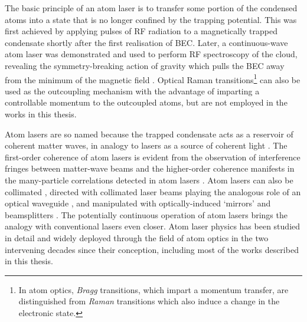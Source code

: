 	The basic principle of an atom laser is to transfer some portion of the condensed atoms into a state that is no longer confined by the trapping potential. This was first achieved by applying pulses of RF radiation to a magnetically trapped condensate shortly after the first realisation of BEC\cite{mewes97}. Later, a continuous-wave atom laser was demonstrated and used to perform RF spectroscopy of the cloud, revealing the symmetry-breaking action of gravity which pulls the BEC away from the minimum of the magnetic field \cite{bloch99}. Optical Raman transitions\footnote{In atom optics, \emph{Bragg} transitions, which impart a momentum transfer, are distinguished from  \emph{Raman} transitions which also induce a change in the electronic state.} can also be used as the outcoupling mechanism \cite{Hagley99} with the advantage of imparting a controllable momentum to the outcoupled atoms, but are not employed in the works in this thesis. 

	Atom lasers are so named because the trapped condensate acts as a reservoir of coherent matter waves, in analogy to lasers as a source of coherent light \cite{narashewski,glauberXX}. The first-order coherence of atom lasers is evident from the observation of interference fringes between matter-wave beams \cite{andrews97} and the higher-order coherence manifests in the many-particle correlations detected in \mhe atom lasers \cite{SomeMorePapers}. Atom lasers can also be collimated \cite{bloch99}, directed with collimated laser beams playing the analogous role of an optical waveguide \cite{Guerin06,couvert08}, and manipulated with optically-induced `mirrors' and beamsplitters \cite{Bloch01}. The potentially continuous operation of atom lasers \cite{Chikkatur02} brings the analogy with conventional lasers even closer. Atom laser physics has been studied in detail and widely deployed through the field of atom optics in the two intervening decades since their conception, including most of the works described in this thesis.
	


